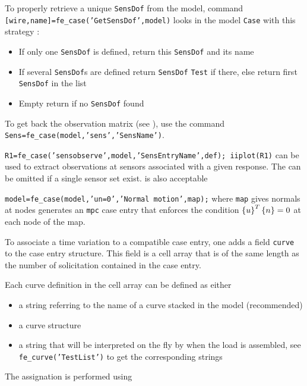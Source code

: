 To properly retrieve a unique {\tt SensDof} from the model, command {\tt [wire,name]=fe\_case('GetSensDof',model)} looks in the model {\tt Case} with this strategy :
\begin{itemize}
\item If only one {\tt SensDof} is defined, return this {\tt SensDof} and its name
\item If several {\tt SensDof}s are defined return {\tt SensDof} {\tt Test} if there, else return first {\tt SensDof} in the list
\item Empty return if no {\tt SensDof} found
\end{itemize}

To get back the observation matrix (see ), use the command {\tt Sens=fe\_case(model,'sens','SensName')}.

{\tt R1=fe\_case('sensobserve',model,'SensEntryName',def); iiplot(R1)} can be used to extract observations at sensors associated with a given response. The  can be omitted if a single sensor set exist.  is also acceptable 


{\tt model=fe\_case(model,'un=0','Normal motion',map);} where {\tt map} gives normals at nodes generates an {\tt mpc} case entry that enforces the condition $\left\{u\right\}^T\left\{n\right\}=0$ at each node of the map.



To associate a time variation to a compatible case entry, one adds a field {\tt curve} to the case entry structure. This field is a cell array that is of the same length as the number of solicitation contained in the case entry. 

Each curve definition in the cell array can be defined as either
\begin{itemize}
\item a string referring to the name of a curve stacked in the model (recommended)
\item a curve structure
\item a string that will be interpreted on the fly by \fecurve when the load is assembled, see {\tt fe\_curve('TestList')} to get the corresponding strings
\end{itemize}

The assignation is performed using 

